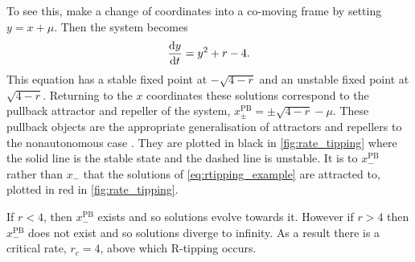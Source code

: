 To see this, make a change of coordinates into a co-moving frame by setting $y = x + \mu$. Then the system becomes
\begin{equation}
  \label{eq:rtipping_co_moving}
  \dv{y}{t} = y^2 + r - 4.
\end{equation}
This equation has a stable fixed point at $-\sqrt{4-r}$ and an unstable fixed point at $\sqrt{4-r}$. Returning to the $x$ coordinates these solutions correspond to the
pullback attractor and repeller of the system, $x^{\mathrm{PB}}_{\pm} = \pm \sqrt{4 - r} - \mu$. These pullback objects are the appropriate generalisation of attractors and repellers to the
nonautonomous case \parencite{Ghil2020a}. They are plotted in black in \cref{fig:rate_tipping} where the solid line
is the stable state and the dashed line is unstable. It is to $x_-^{\mathrm{PB}}$ rather than $x_-$ that the solutions of \cref{eq:rtipping_example} are attracted to, plotted in red
in \cref{fig:rate_tipping}.

If $r < 4$, then $x_-^{\mathrm{PB}}$ exists and so solutions evolve towards it. However if $r > 4$ then $x_-^{\mathrm{PB}}$ does not exist and so solutions diverge to infinity. As a result there
is a critical rate, $r_c = 4$, above which R-tipping occurs.

